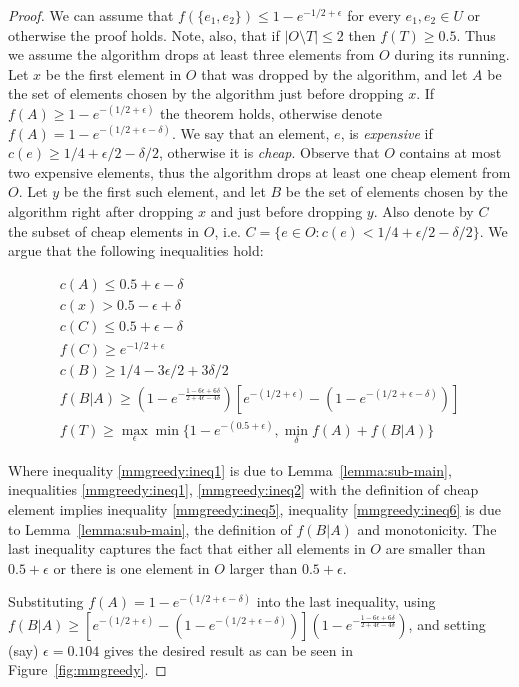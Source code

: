 \def\eps{0.104}
\begin{proof}
We can assume that $f(\{e_1, e_2\}) \leq 1 - e^{-1/2 + \epsilon}$ 
for every $e_1, e_2 \in U$ or otherwise the proof holds.
Note, also, that if $|O \setminus T| \leq 2$ then $f(T) \geq 0.5$.
Thus we assume the algorithm drops at least three elements from $O$ during its running.
Let $x$ be the first element in $O$ that was dropped by the algorithm, 
and let $A$ be the set of elements chosen by the algorithm just before dropping $x$.
If $f(A) \geq 1 - e^{-(1/2 + \epsilon)}$ the theorem holds, 
otherwise denote $f(A) = 1 - e^{-(1/2 + \epsilon - \delta)}$.
We say that an element, $e$, is \emph{expensive} if $c(e) \ge 1/4 + \epsilon/2 - \delta/2$, 
otherwise it is \emph{cheap}.
Observe that $O$ contains at most two expensive elements, thus the algorithm drops 
at least one cheap element from $O$. 
Let $y$ be the first such element, and let $B$ be the set of elements chosen by the 
algorithm right after dropping $x$ and just before dropping $y$.
Also denote by $C$ the subset of cheap elements in $O$, 
i.e. $C = \{e \in O : c(e) < 1/4 + \epsilon/2 - \delta/2\}$.
We argue that the following inequalities hold:

\begin{align}
\label{mmgreedy:ineq1}
c(A) \leq 0.5 + \epsilon - \delta 
\\
\label{mmgreedy:ineq2}
c(x) > 0.5 -\epsilon + \delta
\\
\label{mmgreedy:ineq3}
c(C) \leq 0.5 + \epsilon - \delta
\\
\label{mmgreedy:ineq4}
f(C) \ge e^{-1/2 + \epsilon}
\\
\label{mmgreedy:ineq5}
c(B) \ge 1/4 - 3\epsilon/2 + 3\delta/2
\\
\label{mmgreedy:ineq6}
f(B|A) \ge 
(1-e^{-\frac{1-6\epsilon+6\delta}{2+4\epsilon-4\delta}})
\left[
e^{-(1/2 + \epsilon)}
- (1 - e^{-(1/2 + \epsilon - \delta)})
\right]
\\
\label{mmgreedy:ineq7}
f(T) \geq \max_\epsilon \min \{1 - e^{-(0.5 + \epsilon)}, \min_{\delta} f(A) + f(B|A)\}
\end{align}

Where inequality \ref{mmgreedy:ineq1} is due to Lemma~\ref{lemma:sub-main},
inequalities \ref{mmgreedy:ineq1}, \ref{mmgreedy:ineq2} with the definition of cheap
element implies inequality \ref{mmgreedy:ineq5},
inequality \ref{mmgreedy:ineq6} is due to Lemma~\ref{lemma:sub-main}, the definition
of $f(B|A)$ and monotonicity.
The last inequality captures the fact that either all elements in $O$ are smaller than
$0.5 + \epsilon$ or there is one element in $O$ larger than $0.5 + \epsilon$.


Substituting $f(A) = 1 - e^{-(1/2 + \epsilon - \delta)}$ into the last inequality, 
using $f(B|A) \ge \left[
e^{-(1/2 + \epsilon)}
- (1 - e^{-(1/2 + \epsilon - \delta)})
\right]
(1-e^{-\frac{1-6\epsilon+6\delta}{2+4\epsilon-4\delta}})
$,
and setting (say) $\epsilon = \eps$ gives the desired result 
as can be seen in Figure~\ref{fig:mmgreedy}.

\end{proof}

